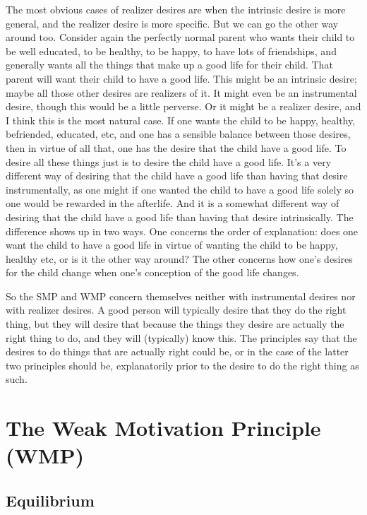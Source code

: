 The most obvious cases of realizer desires are when the intrinsic desire is more general, and the realizer desire is more specific. But we can go the other way around too. Consider again the perfectly normal parent who wants their child to be well educated, to be healthy, to be happy, to have lots of friendships, and generally wants all the things that make up a good life for their child. That parent will want their child to have a good life. This might be an intrinsic desire; maybe all those other desires are realizers of it. It might even be an instrumental desire, though this would be a little perverse. Or it might be a realizer desire, and I think this is the most natural case. If one wants the child to be happy, healthy, befriended, educated, etc, and one has a sensible balance between those desires, then in virtue of all that, one has the desire that the child have a good life. To desire all these things just is to desire the child have a good life. It's a very different way of desiring that the child have a good life than having that desire instrumentally, as one might if one wanted the child to have a good life solely so one would be rewarded in the afterlife. And it is a somewhat different way of desiring that the child have a good life than having that desire intrinsically. The difference shows up in two ways. One concerns the order of explanation: does one want the child to have a good life in virtue of wanting the child to be happy, healthy etc, or is it the other way around? The other concerns how one's desires for the child change when one's conception of the good life changes.

So the SMP and WMP concern themselves neither with instrumental desires nor with realizer desires. A good person will typically desire that they do the right thing, but they will desire that because the things they desire are actually the right thing to do, and they will (typically) know this. The principles say that the desires to do things that are actually right could be, or in the case of the latter two principles should be, explanatorily prior to the desire to do the right thing as such.

\section{The Weak Motivation Principle (WMP)}
\label{theweakmotivationprinciplewmp}

\subsection{Equilibrium}
\label{equilibrium}

